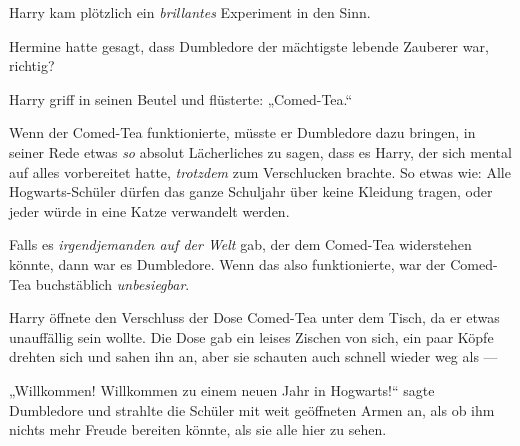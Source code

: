 Harry kam plötzlich ein \emph{brillantes} Experiment in den Sinn.

Hermine hatte gesagt, dass Dumbledore der mächtigste lebende Zauberer war, richtig?

Harry griff in seinen Beutel und flüsterte:
„Comed-Tea.“

Wenn der Comed-Tea funktionierte, müsste er Dumbledore dazu bringen, in seiner Rede etwas \emph{so} absolut Lächerliches zu sagen, dass es Harry, der sich mental auf alles vorbereitet hatte, \emph{trotzdem} zum Verschlucken brachte. So etwas wie: Alle Hogwarts-Schüler dürfen das ganze Schuljahr über keine Kleidung tragen, oder jeder würde in eine Katze verwandelt werden.

Falls es \emph{irgendjemanden auf der Welt} gab, der dem Comed-Tea widerstehen könnte, dann war es Dumbledore. Wenn das also funktionierte, war der Comed-Tea buchstäblich \emph{unbesiegbar}.

Harry öffnete den Verschluss der Dose Comed-Tea unter dem Tisch, da er etwas unauffällig sein wollte. Die Dose gab ein leises Zischen von sich, ein paar Köpfe drehten sich und sahen ihn an, aber sie schauten auch schnell wieder weg als —

„Willkommen! Willkommen zu einem neuen Jahr in Hogwarts!“ sagte Dumbledore und strahlte die Schüler mit weit geöffneten Armen an, als ob ihm nichts mehr Freude bereiten könnte, als sie alle hier zu sehen.

